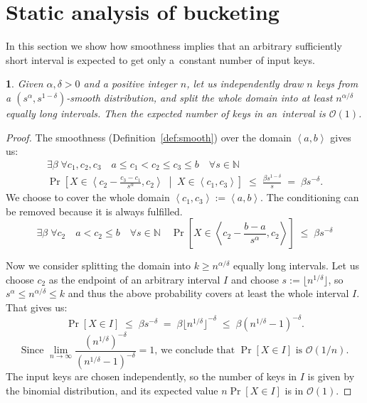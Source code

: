 \documentclass[
submission
]{dmtcs-episciences}
\theoremstyle{plain}
\theoremstyle{definition}
\theoremstyle{remark}
\theoremstyle{plain}
\newtheorem*{lem*}{\protect\lemmaname}
\theoremstyle{plain}
\newcounter{lemma}
\providecommand{\lemmaname}{Lemma}
\def\interval#1#2{\left\langle#1,#2\right\rangle}
\def\eqspaces{\;=\;}
\def\lespaces{\;\le\;}
\def\Prob#1{\Pr\!\left[#1\right]}
\def\OO{\mathcal O}
\def\natural{\mathbb{N}}
\begin{document}
\section{Static analysis of bucketing}
 \label{sec:smooth-bucket}
In this section we show how smoothness implies that an arbitrary sufficiently
short interval is expected to get only a~constant number of input keys.
\begin{lem*}
\label{lem:smooth-bucket}
Given $\alpha,\delta>0$ and a positive
integer $n$, let us independently draw $n$ keys from a $\left(s^{\alpha},s^{1-\delta}\right)$-smooth
distribution, and split the whole domain into at least $n^{\alpha/\delta}$
equally long intervals. Then the expected number of keys in an~interval
is $\OO(1)$.
\end{lem*}
\begin{proof}
The smoothness (Definition~\ref{def:smooth}) over the domain $\interval a b$ gives us:
\begin{multline*}
	\exists\beta \; \forall c_1,c_2,c_3 \quad a \le c_1 < c_2 \le c_3 \le b \quad \forall s \in \natural \\
		\Prob{  X \in \interval{ c_2 - \frac{c_3-c_1}{s^\alpha} }{c_2} \; \middle| \; X \in \interval{c_1}{c_3}  }
		\lespaces \frac{\beta s^{1-\delta}}{s}  \eqspaces  \beta s^{-\delta}.
\end{multline*}
We choose to cover the whole domain $\interval{c_1}{c_3} := \interval a b$. The conditioning can be removed because it is always fulfilled.
\[
	\exists\beta \; \forall c_2 \quad a < c_2 \le b \quad \forall s \in \natural \quad
		\Prob{  X \in \interval{ c_2 - \frac{b-a}{s^\alpha} }{c_2}  }
		\lespaces \beta s^{-\delta}
\]

Now we consider splitting the domain into $k \ge n^{\alpha / \delta}$ equally long intervals.
Let us choose $c_2$ as the endpoint of an arbitrary
interval $I$ and choose $s:= \lfloor n^{1 / \delta} \rfloor$, so
$ s^\alpha \le n^{\alpha / \delta} \le k $ and thus the above probability covers at least the whole interval $I$. That gives us:
\[	\Prob{X \in I} \lespaces \beta s^{-\delta}
	\eqspaces \beta {\lfloor n^{1 / \delta} \rfloor}^{-\delta}
	\lespaces \beta \left( n^{1 / \delta} - 1 \right) ^{-\delta}.
\] \[
\text{Since } \lim_{n \to \infty}
	\frac{ ( n^{1 / \delta} ) ^{-\delta} }{ ( n^{1 / \delta} - 1 ) ^{-\delta} }
	= 1 \text{, we conclude that } \Prob{X \in I} \text{ is } \OO(1/n).
\]
%
The input keys are chosen independently, so the number of keys in $I$ is given by the binomial distribution, and its expected value
$n \Prob{X \in I}$ is in $\OO(1)$.
\end{proof}
\end{document}
